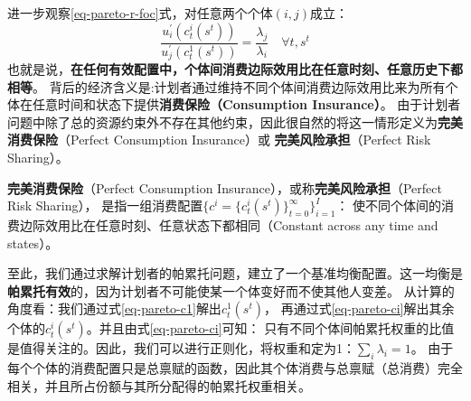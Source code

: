 进一步观察\ref{eq-pareto-r-foc}式，对任意两个个体$(i,j)$成立：
\begin{equation*}
    \frac{u_i^{\prime}\left(c_t^i\left(s^t\right)\right)}{u_j^{\prime}\left(c_t^1\left(s^t\right)\right)}=\frac{\lambda_j}{\lambda_i}
        \quad \forall t, s^t
\end{equation*}
也就是说，\textbf{在任何有效配置中，个体间消费边际效用比在任意时刻、任意历史下都相等}。
背后的经济含义是:计划者通过维持不同个体间消费边际效用比来为所有个体在任意时间和状态下提供\textbf{消费保险（Consumption Insurance）}。
由于计划者问题中除了总的资源约束外不存在其他约束，因此很自然的将这一情形定义为\textbf{完美消费保险}（Perfect Consumption Insurance）或
\textbf{完美风险承担}（Perfect Risk Sharing）。

\begin{definition}  \label{def-perfect-c-insurance}
    \textbf{完美消费保险}（Perfect Consumption Insurance），或称\textbf{完美风险承担}（Perfect Risk Sharing），
    是指一组消费配置$\{c^i=\{c_t^i\left(s^t\right)\}_{t=0}^{\infty}\}_{i=1}^{I}$：
    使不同个体间的消费边际效用比在任意时刻、任意状态下都相同（Constant across any time and states）。
\end{definition}

至此，我们通过求解计划者的帕累托问题，建立了一个基准均衡配置。这一均衡是\textbf{帕累托有效}的，因为计划者不可能使某一个体变好而不使其他人变差。
从计算的角度看：我们通过式\ref{eq-pareto-c1}解出$c_t^1\left(s^t\right)$，
再通过式\ref{eq-pareto-ci}解出其余个体的$c_t^i\left(s^t\right)$。并且由式\ref{eq-pareto-ci}可知：
只有不同个体间帕累托权重的比值是值得关注的。因此，我们可以进行正则化，将权重和定为1：$\sum_{i}\lambda_i = 1$。
由于每个个体的消费配置只是总禀赋的函数，因此其个体消费与总禀赋（总消费）完全相关，并且所占份额与其所分配得的帕累托权重相关。
